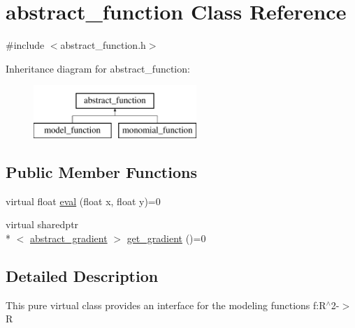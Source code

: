 \hypertarget{classabstract__function}{\section{abstract\-\_\-function Class Reference}
\label{classabstract__function}
}


{\ttfamily \#include $<$abstract\-\_\-function.\-h$>$}

Inheritance diagram for abstract\-\_\-function\-:\begin{figure}[H]
\begin{center}
\leavevmode
\includegraphics[height=2.000000cm]{classabstract__function}
\end{center}
\end{figure}
\subsection*{Public Member Functions}
\begin{DoxyCompactItemize}
\item 
virtual float \hyperlink{classabstract__function_ae313a63bae0ae1b88bcabd1bebc22f4f}{eval} (float x, float y)=0
\item 
virtual sharedptr\\*
$<$ \hyperlink{classabstract__gradient}{abstract\-\_\-gradient} $>$ \hyperlink{classabstract__function_a6ac83b83ed81cbd1c67ccfb9ddcf310b}{get\-\_\-gradient} ()=0
\end{DoxyCompactItemize}


\subsection{Detailed Description}
This pure virtual class provides an interface for the modeling functions f\-:R$^\wedge$2-\/$>$R 

